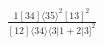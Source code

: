 \documentclass[varwidth, border=5pt]{standalone}
\begin{document}
\begin{my}
$\begin{gathered}
\scriptscriptstyle\frac{1[34]⟨35⟩^2[13]^2}{[12]⟨34⟩⟨3|1+2|3]^2}
\end{gathered}$
\end{my}
\end{document}
